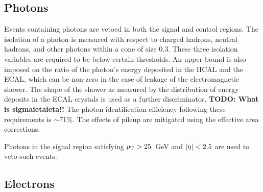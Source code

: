 \subsection*{Photons}



Events containing photons are vetoed in both the signal and control regions. 
The isolation of a photon is measured with respect to charged 
hadrons, neutral hadrons, and other photons within a \detadphi cone of size 
$0.3$. These three isolation variables are required to be below certain 
thresholds. 
An upper bound is also imposed on the ratio of the photon's energy deposited in 
the HCAL and the ECAL, which can be non-zero in the case of leakage of the 
electromagnetic shower. The shape of the shower as measured by the distribution 
of energy deposits in the ECAL crystals is used as a further discriminator. 
\textbf{TODO: What is sigmaietaieta!!}
The photon identification efficiency following these requirements is 
$\sim$71\%. The effects of pileup are mitigated using the effective area 
corrections.


Photons in the signal region satisfying ${p_{\text T}}>25$~GeV and $|\eta|<2.5$ are used 
to veto such events.

\subsection*{Electrons}


